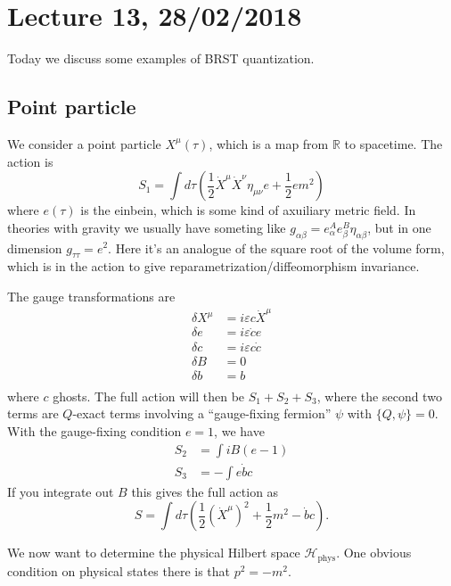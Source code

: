 \section*{Lecture 13, 28/02/2018}
Today we discuss some examples of BRST quantization.

\subsection*{Point particle}
We consider a point particle $X^\mu(\tau)$, which is a map from $\mathbb R$ to spacetime.
The action is
\[
S_1 = \int d\tau \left (\frac{1}{2} \dot X^\mu \dot X^\nu \eta_{\mu \nu} e + \frac{1}{2} e m^2 \right)
\]
where $e(\tau)$ is the einbein, which is some kind of axuiliary metric field.
In theories with gravity we usually have someting like $g_{\alpha \beta} = e^A_\alpha e^B_\beta \eta_{\alpha \beta}$, but in one dimension $g_{\tau \tau} = e^2$.
Here it's an analogue of the square root of the volume form, which is in the action to give reparametrization/diffeomorphism invariance.

The gauge transformations are
\begin{align*}
\delta X^\mu &= i \varepsilon c \dot X^\mu\\
\delta e &= i \varepsilon \dot c e\\
\delta c &= i \varepsilon c \dot c\\
\delta B &= 0\\
\delta b &= b\\
\end{align*}
where $c$  ghosts.
The full action will then be $S_1 + S_2 + S_3$, where the second two terms are $Q$-exact terms involving a ``gauge-fixing fermion'' $\psi$ with $\{ Q, \psi\}  = 0$.
With the gauge-fixing condition $e = 1$, we have
\begin{align*}
S_2 &= \int i B(e-1)\\
S_3 &= -\int e \dot bc
\end{align*}
If you integrate out $B$ this gives the full action as
\[
S = \int d \tau \left( \frac{1}{2} (\dot X^\mu)^2 + \frac{1}{2} m^2 - \dot b c \right).
\]

We now want to determine the physical Hilbert space $\mathcal H_{\text{phys}}$.
One obvious condition on physical states there is that $p^2 = -m^2$.


